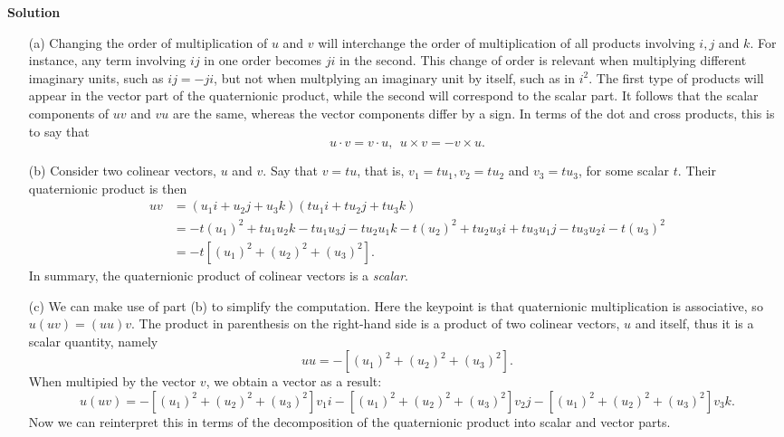 \documentclass[12pt,oneside]{exam}
\newenvironment{newsolution}{\vspace{.1in}\noindent\textbf{Solution \hspace{.05em}}}{}
\begin{document}
\begin{newsolution}
\begin{itemize}
\item[(a)] Changing the order of multiplication of $u$ and $v$ will interchange the order of multiplication of all products involving $i,j$ and $k$. For instance, any term involving $ij$ in one order becomes $ji$ in the second. This change of order is relevant when multiplying different imaginary units, such as $ij=-ji$, but not when multplying an imaginary unit by itself, such as in $i^2$. The first type of products will appear in the vector part of the quaternionic product, while the second will correspond to the scalar part. It follows that the scalar components of $uv$ and $vu$ are the same, whereas the vector components differ by a sign. In terms of the dot and cross products, this is to say that
\begin{equation*}
u\cdot v = v\cdot u, \ \ u \times v = -v \times u.
\end{equation*}
\item[(b)] Consider two colinear vectors, $u$ and $v$. Say that $v=tu$, that is, $v_1=tu_1, v_2=tu_2$ and $v_3=tu_3$, for some scalar $t$. Their quaternionic product is then 
\begin{align*}
uv & =(u_1 i + u_2j +u_3k)(tu_1 i +t u_2j + tu_3k)\\
& = -t(u_1)^2 +tu_1u_2 k - t u_1u_3 j - tu_2u_1 k -t(u_2)^2 + tu_2u_3 i + tu_3u_1 j -t u_3u_2 i -t(u_3)^2\\
& = -t [(u_1)^2 + (u_2)^2 + (u_3)^2].
\end{align*}
In summary, the quaternionic product of colinear vectors is a  \textit{scalar}. 
\item[(c)] We can make use of part (b) to simplify the computation. Here the keypoint is that quaternionic multiplication is associative, so $u(uv)=(uu)v$. The product in parenthesis on the right-hand side is a product of two colinear vectors, $u$ and itself, thus it is a scalar quantity, namely
\begin{equation*}
uu=-[(u_1)^2+(u_2)^2+(u_3)^2].
\end{equation*}
When multipied by the vector $v$, we obtain a vector as a result:
\begin{equation*}
u(uv)=-[(u_1)^2+(u_2)^2+(u_3)^2]v_1 i  -[(u_1)^2+(u_2)^2+(u_3)^2] v_2j  -[(u_1)^2+(u_2)^2+(u_3)^2] v_3k.
\end{equation*}
Now we can reinterpret this in terms of the decomposition of the quaternionic product into scalar and vector parts. 
\begin{align*}

\end{align*}
\end{itemize}
\end{newsolution}
\end{document}
